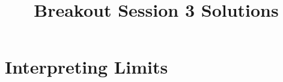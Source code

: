 \documentclass[nooutcomes]{ximera}
\title{Breakout Session 3 Solutions}
\begin{document}
\begin{abstract}


\end{abstract}
\maketitle

\section{Interpreting Limits}
\label{section:interpreting-limits}
\end{document}
